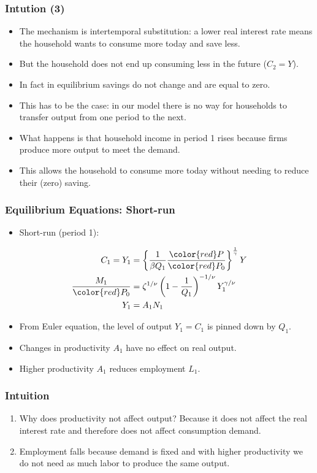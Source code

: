 \documentclass[english,xcolor=svgnames]{beamer}
\begin{document}
\begin{frame}
	\frametitle{Intution (3)
	}
	\begin{itemize}
		\item The mechanism is intertemporal substitution: a lower real interest rate means the household wants to consume more today and save less. 
		\item But the household does not end up consuming less in the future ($C_2=Y$). 
		\item In fact in equilibrium savings do not change and are equal to zero.
		\item This has to be the case: in our model there is no way for households to transfer output from one period to the next.
		\item What happens is that household income in period 1 rises because firms produce more output to meet the demand.
		\item This allows the household to consume more today without needing to reduce their (zero) saving.
	\end{itemize}
\end{frame}
	

\begin{frame}
\frametitle{Equilibrium Equations: Short-run}
\begin{itemize}
	\item Short-run (period 1):
\end{itemize}
\begin{align*}
	C_1 = Y_1&= \left\{ \frac{1}{\beta Q_1} \frac{\color{red} P}{\color{red} P_0} \right\}^{\frac{1}{\gamma}} Y \\
	\frac{M_1}{\color{red} P_0}&=\zeta^{1/\nu}\left(1-\frac{1}{Q_1}\right)^{-1/\nu}Y_{1}^{\gamma/\nu}\\
	Y_1&=A_1N_{1}  
\end{align*}
\begin{itemize}
	\item From Euler equation, the level of output $Y_1 = C_1$ is pinned down by $Q_1$.
	\item Changes in productivity $A_1$ have no effect on real output.
	\item Higher productivity $A_1$ reduces employment $L_1$.
\end{itemize}
\end{frame}

\begin{frame}
\frametitle{Intuition
}
\begin{enumerate}[3.]
	\item Why does productivity not affect output? Because it does not affect the real interest rate and therefore does not affect consumption demand.
	\item Employment falls because demand is fixed and with higher productivity we do not need as much labor to produce the same output.
\end{enumerate}
\end{frame}
\end{document}
